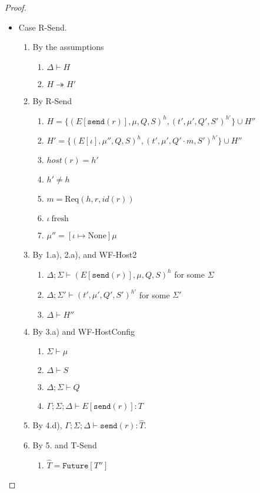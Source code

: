 \documentclass{article}
\theoremstyle{definition}
\newcommand{\Req}[3]{\text{Req}(#1, #2, #3)}
\begin{document}
\begin{proof}
\begin{itemize}
\item Case R-Send.
\begin{enumerate}
\item By the assumptions
  \begin{enumerate}[label=(\alph*)]
  \item $\Delta \vdash H$
  \item $H \twoheadrightarrow H'$
  \end{enumerate}
\item By R-Send
  \begin{enumerate}[label=(\alph*)]
  \item $H = \{ (E[\texttt{send}(r)], \mu, Q, S)^h, (t', \mu', Q', S')^{h'} \} \cup H''$
  \item $H' = \{ (E[\iota], \mu'', Q, S)^h, (t', \mu', Q' \cdot m, S')^{h'} \} \cup H''$
  \item $host(r) = h'$
  \item $h' \neq h$
  \item $m = {\Req h r {id(r)}}$
  \item $\iota~\text{fresh}$
  \item $\mu'' = [\iota \mapsto \text{None}]\mu$
  \end{enumerate}
\item By 1.a), 2.a), and WF-Host2
  \begin{enumerate}[label=(\alph*)]
  \item $\Delta ; \Sigma \vdash (E[\texttt{send}(r)], \mu, Q, S)^h$ for some $\Sigma$
  \item $\Delta ; \Sigma' \vdash (t', \mu', Q', S')^{h'}$ for some $\Sigma'$
  \item $\Delta \vdash H''$
  \end{enumerate}
\item By 3.a) and WF-HostConfig
  \begin{enumerate}[label=(\alph*)]
  \item $\Sigma \vdash \mu$
  \item $\Delta \vdash S$
  \item $\Delta ; \Sigma \vdash Q$
  \item $\Gamma ; \Sigma ; \Delta \vdash E[\texttt{send}(r)] : T$
  \end{enumerate}
\item By 4.d), $\Gamma ; \Sigma ; \Delta \vdash \texttt{send}(r) : \hat{T}$.
\item By 5. and T-Send
  \begin{enumerate}[label=(\alph*)]
  \item $\hat{T} = \texttt{Future}[T'']$

\end{enumerate}
\end{enumerate}
\end{itemize}
\end{proof}
\end{document}
